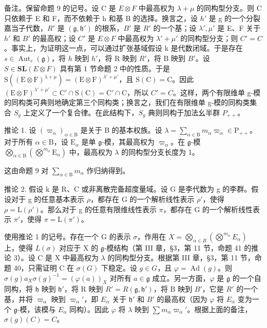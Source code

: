 备注。保留命题 9 的记号。设 C 是 \(E \otimes F\) 中最高权为 \(\lambda + \mu\) 的同构型分支。则 C 只依赖于 E 和 F，而不依赖于 h 和基 B 的选择。换言之，设 \(h'\) 是 g 的一个分裂嘉当子代数，\(R'\) 是 \((\mathfrak{g}, \mathfrak{h}')\) 的根系，\(B'\) 是 \(R'\) 的一个基；设 \(\lambda', \mu'\) 是 E、F 关于 \(h'\) 和 \(B'\) 的最高权；设 \(C'\) 是 \(E \otimes F\) 中最高权为 \(\lambda' + \mu'\) 的同构型分支；则 \(C' = C\)。事实上，为证明这一点，可以通过扩张基域假设 k 是代数闭域。于是存在 \(s \in \operatorname{Aut}_{e}(\mathfrak{g})\)，将 \(h\) 映到 \(h'\)，将 R 映到 \(R'\)，将 B 映到 \(B'\)。设 \(S \in \mathbf{SL}(E \otimes F)\) 具有第 1 节命题 2 中的性质。于是 \(\mathrm{S}((\mathrm{E} \otimes \mathrm{F})^{\lambda + \mu}) = (\mathrm{E} \otimes \mathrm{F})^{\lambda' + \mu'}\)，且 \(\mathrm{S}(\mathrm{C}) = \mathrm{C}\)。因此 \((\mathrm{E} \otimes \mathrm{F})^{\lambda' + \mu'} \subset \mathrm{C}' \cap \mathrm{S}(\mathrm{C}) = \mathrm{C}' \cap \mathrm{C}\)，所以 \(C' = C\)。这样，两个有限维单 g-模的同构类可典则地确定第三个同构类；换言之，我们在有限维单 g-模的同构类集合 \(S_{g}\) 上定义了一个复合律。在此结构下，\(S_{g}\) 典则同构于加法幺半群 \(P_{++}\)。

推论 1. 设 \((\varpi_{\alpha})_{\alpha \in \mathrm{B}}\) 是关于 B 的基本权族。设 \(\lambda = \sum_{\alpha \in \mathrm{B}} m_{\alpha} \varpi_{\alpha} \in \mathrm{P}_{++}\)。对于所有 \(\alpha \in \mathrm{B}\)，设 \(\mathrm{E}_{\alpha}\) 是单 \(\mathfrak{g}\)-模，其最高权为 \(\varpi_{\alpha}\)。在 \(\mathfrak{g}\)-模 \(\bigotimes_{\alpha \in \mathrm{B}} (\bigotimes^{m_{\alpha}} \mathrm{E}_{\alpha})\) 中，最高权为 \(\lambda\) 的同构型分支长度为 1。

这由命题 9 对 \(\sum_{\alpha \in \mathrm{B}}m_{\alpha}\) 作归纳得到。

推论 2. 假设 k 是 R、C 或非离散完备超度量域。设 G 是李代数为 g 的李群。假设对于 g 的任意基本表示 \(\rho\)，都存在 G 的一个解析线性表示 \(\rho'\)，使得 \(\rho = \mathrm{L}(\rho')\)。那么对于 g 的任意有限维线性表示 \(\pi\)，都存在 G 的一个解析线性表示 \(\pi'\)，使得 \(\pi = \mathrm{L}(\pi')\)。

使用推论 1 的记号。存在一个 G 的表示 \(\sigma\)，作用在 \(X = \bigotimes_{\alpha \in B} (\bigotimes^{m_{\alpha}} E_{\alpha})\) 上，使得 \(L(\sigma)\) 对应于 X 的 \(\mathfrak{g}\)-模结构（第 III 章，§3，第 11 节，命题 41 的推论 3）。设 C 是 X 中最高权为 \(\lambda\) 的同构型分支。根据第 III 章，§3，第 11 节，命题 40，只需证明 C 在 \(\sigma(G)\) 下稳定。设 \(g \in G\)，且 \(\varphi = \operatorname{Ad}(g)\)。则 \(\sigma(g)a_X \sigma(g)^{-1} = (\varphi(a))_X\) 对所有 \(a \in \mathfrak{g}\) 成立。另一方面，\(\varphi\) 是 \(\mathfrak{g}\) 的一个自同构，将 \(\mathfrak{h}\) 映到 \(\mathfrak{h}'\)，将 R 映到 \(R' = R(\mathfrak{g}, \mathfrak{h}')\)，将 B 映到 \(B'\)，它是 \(R'\) 的一个基，并将 \(\varpi_{\alpha}\) 映到 \(\varpi_{\alpha}'\)，即 \(E_{\alpha}\) 关于 \(\mathfrak{h}'\) 和 \(B'\) 的最高权（因为 \(\varphi\) 将 \(E_{\alpha}\) 变为一个 \(\mathfrak{g}\)-模，该模与 \(E_{\alpha}\) 同构）。因此 \(\varphi\) 将 \(\lambda\) 映到 \(\sum m_{\alpha} \varpi_{\alpha}'\)。根据上面的备注，\(\sigma(g)(C) = C\)。

